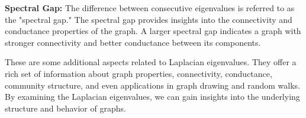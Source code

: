 \documentclass{article}
\begin{document}
\textbf{Spectral Gap:} The difference between consecutive eigenvalues is referred to as the "spectral gap." The spectral gap provides insights into the connectivity and conductance properties of the graph. A larger spectral gap indicates a graph with stronger connectivity and better conductance between its components.

These are some additional aspects related to Laplacian eigenvalues. They offer a rich set of information about graph properties, connectivity, conductance, community structure, and even applications in graph drawing and random walks. By examining the Laplacian eigenvalues, we can gain insights into the underlying structure and behavior of graphs.
\end{document}

